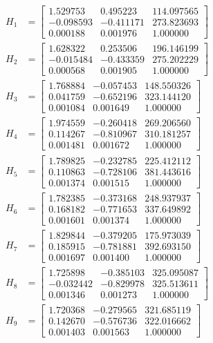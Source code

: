 \begin{align*}
H_{1} &= \begin{bmatrix}1.529753 & 0.495223 & 114.097565 \\ -0.098593 & -0.411171 & 273.823693 \\ 0.000188 & 0.001976 & 1.000000\end{bmatrix} \\
H_{2} &= \begin{bmatrix}1.628322 & 0.253506 & 196.146199 \\ -0.015484 & -0.433359 & 275.202229 \\ 0.000568 & 0.001905 & 1.000000\end{bmatrix} \\
H_{3} &= \begin{bmatrix}1.768884 & -0.057453 & 148.550326 \\ 0.041759 & -0.652196 & 323.144120 \\ 0.001084 & 0.001649 & 1.000000\end{bmatrix} \\
H_{4} &= \begin{bmatrix}1.974559 & -0.260418 & 269.206560 \\ 0.114267 & -0.810967 & 310.181257 \\ 0.001481 & 0.001672 & 1.000000\end{bmatrix} \\
H_{5} &= \begin{bmatrix}1.789825 & -0.232785 & 225.412112 \\ 0.110863 & -0.728106 & 381.443616 \\ 0.001374 & 0.001515 & 1.000000\end{bmatrix} \\
H_{6} &= \begin{bmatrix}1.782385 & -0.373168 & 248.937937 \\ 0.168182 & -0.771653 & 337.649892 \\ 0.001601 & 0.001374 & 1.000000\end{bmatrix} \\
H_{7} &= \begin{bmatrix}1.829844 & -0.379205 & 175.973039 \\ 0.185915 & -0.781881 & 392.693150 \\ 0.001697 & 0.001400 & 1.000000\end{bmatrix} \\
H_{8} &= \begin{bmatrix}1.725898 & -0.385103 & 325.095087 \\ -0.032442 & -0.829978 & 325.513611 \\ 0.001346 & 0.001273 & 1.000000\end{bmatrix} \\
H_{9} &= \begin{bmatrix}1.720368 & -0.279565 & 321.685119 \\ 0.142670 & -0.576736 & 322.016662 \\ 0.001403 & 0.001563 & 1.000000\end{bmatrix} \\
\end{align*}